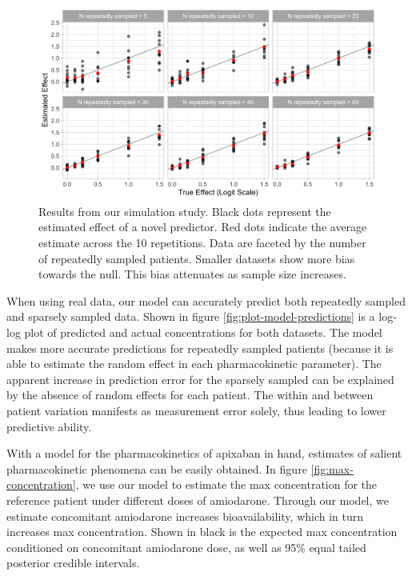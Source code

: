 \begin{figure}
	
	{\centering \includegraphics[width=\linewidth]{figures/simulation-results-1} 
		
	}
	
	\caption{Results from our simulation study.  Black dots represent the estimated effect of a novel predictor.  Red dots indicate the average estimate across the 10 repetitions. Data are faceted by the number of repeatedly sampled patients.  Smaller datasets show more bias towards the null.  This bias attenuates as sample size increases.}\label{fig:simulation-results}
\end{figure}


When using real data, our model can accurately predict both repeatedly
sampled and sparsely sampled data. Shown in figure
\ref{fig:plot-model-predictions} is a log-log plot of predicted and
actual concentrations for both datasets. The model makes more accurate
predictions for repeatedly sampled patients (because it is able to
estimate the random effect in each pharmacokinetic parameter). The
apparent increase in prediction error for the sparsely sampled can be
explained by the absence of random effects for each patient. The within
and between patient variation manifests as measurement error solely,
thus leading to lower predictive ability.

With a model for the pharmacokinetics of apixaban in hand, estimates of
salient pharmacokinetic phenomena can be easily obtained. In figure
\ref{fig:max-concentration}, we use our model to estimate the max
concentration for the reference patient under different doses of
amiodarone. Through our model, we estimate concomitant amiodarone
increases bioavailability, which in turn increases max concentration.
Shown in black is the expected max concentration conditioned on
concomitant amiodarone dose, as well as 95\% equal tailed posterior
credible intervals.

